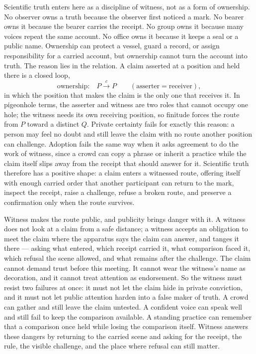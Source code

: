 Scientific truth enters here as a discipline of witness, not as a form of ownership. No observer owns a truth because the observer first noticed a mark. No bearer owns it because the bearer carries the receipt. No group owns it because many voices repeat the same account. No office owns it because it keeps a seal or a public name. Ownership can protect a vessel, guard a record, or assign responsibility for a carried account, but ownership cannot turn the account into truth. The reason lies in the relation. A claim asserted at a position and held there is a closed loop,
\[ \text{ownership:}\quad P \xrightarrow{\;c\;} P \qquad (\text{asserter} = \text{receiver}), \]
in which the position that makes the claim is the only one that receives it. In pigeonhole terms, the asserter and witness are two roles that cannot occupy one hole; the witness needs its own receiving position, so finitude forces the route from $P$ toward a distinct $Q$. Private certainty fails for exactly this reason: a person may feel no doubt and still leave the claim with no route another position can challenge. Adoption fails the same way when it asks agreement to do the work of witness, since a crowd can copy a phrase or inherit a practice while the claim itself slips away from the receipt that should answer for it. Scientific truth therefore has a positive shape: a claim enters a witnessed route, offering itself with enough carried order that another participant can return to the mark, inspect the receipt, raise a challenge, refuse a broken route, and preserve a confirmation only when the route survives.

Witness makes the route public, and publicity brings danger with it. A witness does not look at a claim from a safe distance; a witness accepts an obligation to meet the claim where the apparatus says the claim can answer, and tanges it there --- asking what entered, which receipt carried it, what comparison faced it, which refusal the scene allowed, and what remains after the challenge. The claim cannot demand trust before this meeting. It cannot wear the witness's name as decoration, and it cannot treat attention as endorsement. So the witness must resist two failures at once: it must not let the claim hide in private conviction, and it must not let public attention harden into a false maker of truth. A crowd can gather and still leave the claim untested. A confident voice can speak well and still fail to keep the comparison available. A standing practice can remember that a comparison once held while losing the comparison itself. Witness answers these dangers by returning to the carried scene and asking for the receipt, the rule, the visible challenge, and the place where refusal can still matter.

